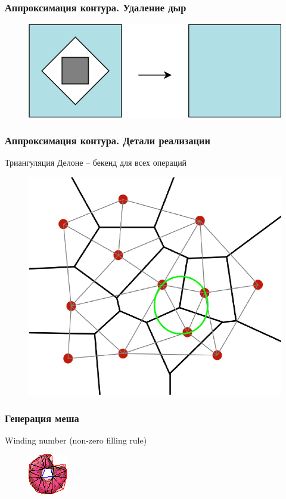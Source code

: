\documentclass[10pt, unicode]{beamer}
\begin{document}
    \begin{frame}
        \frametitle{Аппроксимация контура. Удаление дыр}
        \begin{figure}[H]
            \centering
            \includegraphics[width=0.8\linewidth, keepaspectratio]{remove_hole.png}
        \end{figure}
    \end{frame}
    \begin{frame}
        \frametitle{Аппроксимация контура. Детали реализации}
        Триангуляция Делоне -- бекенд для всех операций
        \begin{figure}[H]
            \centering
            \includegraphics[width=0.7\linewidth, keepaspectratio]{DelaunayAndVoronoi.png}
        \end{figure}
    \end{frame}
    \begin{frame}
        \frametitle{Генерация меша}
        Winding number (non-zero filling rule)
        \begin{figure}[H]
            \centering
            \includegraphics[scale=1.5]{donutpixel_mesh.png}
        \end{figure}
    \end{frame}
\end{document}
